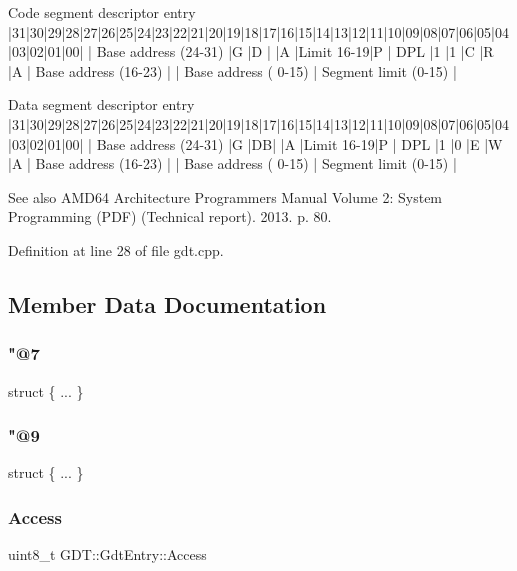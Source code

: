 \begin{DoxyVerb}Code segment descriptor entry
|31|30|29|28|27|26|25|24|23|22|21|20|19|18|17|16|15|14|13|12|11|10|09|08|07|06|05|04|03|02|01|00|
| Base address (24-31)  |G |D |  |A |Limit 16-19|P | DPL |1 |1 |C |R |A | Base address (16-23)  |
| Base address ( 0-15)                          |                         Segment limit (0-15)  |

Data segment descriptor entry
|31|30|29|28|27|26|25|24|23|22|21|20|19|18|17|16|15|14|13|12|11|10|09|08|07|06|05|04|03|02|01|00|
| Base address (24-31)  |G |DB|  |A |Limit 16-19|P | DPL |1 |0 |E |W |A | Base address (16-23)  |
| Base address ( 0-15)                          |                         Segment limit (0-15)  |
\end{DoxyVerb}
 \begin{DoxySeeAlso}{See also}
A\+M\+D64 Architecture Programmer\textquotesingle{}s Manual Volume 2\+: System Programming (P\+DF) (Technical report). 2013. p. 80. 
\end{DoxySeeAlso}


Definition at line 28 of file gdt.\+cpp.



\subsection{Member Data Documentation}
\mbox{\label{union_g_d_t_1_1_gdt_entry_a0a5bd472a0d72346d4e1414b7b8e6368}} 
\subsubsection{\texorpdfstring{"@7}{@7}}
{\footnotesize\ttfamily struct \{ ... \} }

\mbox{\label{union_g_d_t_1_1_gdt_entry_aae90b16461c5e9bc39f35217c6ef4a5b}} 
\subsubsection{\texorpdfstring{"@9}{@9}}
{\footnotesize\ttfamily struct \{ ... \} }

\mbox{\label{union_g_d_t_1_1_gdt_entry_a9e362a6b3aad509ffc6620df7d3bca21}} 
\subsubsection{\texorpdfstring{Access}{Access}}
{\footnotesize\ttfamily uint8\+\_\+t G\+D\+T\+::\+Gdt\+Entry\+::\+Access}



